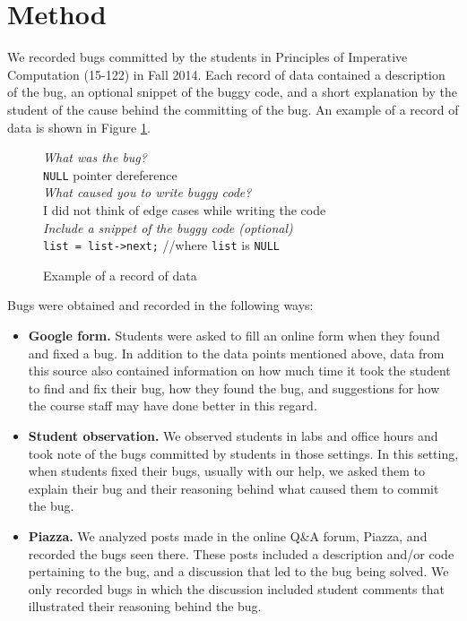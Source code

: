 \documentclass{sig-alternate}
\begin{document}
\section{Method}
\label{sec:method}

We recorded bugs committed by the students in Principles of Imperative Computation (15-122) in Fall 2014. Each record of data contained a description of the bug, an optional snippet of the buggy code, and a short explanation by the student of the cause behind the committing of the bug. An example of a record of data is shown in Figure \ref{fig:record}.\\ 

\begin{figure}
\begin{framed}
\emph{What was the bug?}\\
\verb|NULL| pointer dereference\\

\emph{What caused you to write buggy code?}\\
 I did not think of edge cases while writing the code\\

\emph{Include a snippet of the buggy code (optional)}\\
\verb|list = list->next;| //where \verb|list| is \verb|NULL|
\end{framed}
\caption{Example of a record of data}
\label{fig:record}
\end{figure}


Bugs were obtained and recorded in the following ways:
\begin{itemize}
\item{\textbf{Google form.} Students were asked to fill an online form when they found and fixed a bug. In addition to the data points mentioned above, data from this source also contained information on how much time it took the student to find and fix their bug, how they found the bug, and suggestions for how the course staff may have done better in this regard.} %


\item{\textbf{Student observation.} We observed students in labs and office hours and took note of the bugs committed by students in those settings. In this setting, when students fixed their bugs, usually with our help, we asked them to explain their bug and their reasoning behind what caused them to commit the bug.}
\item{\textbf{Piazza.} We analyzed posts made in the online Q\&A forum, Piazza, and recorded the bugs seen there. These posts included a description and/or code pertaining to the bug, and a discussion that led to the bug being solved. We only recorded bugs in which the discussion included student comments that illustrated their reasoning behind the bug.}
\end{itemize}
\end{document}
